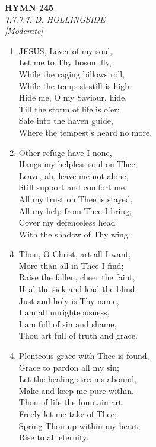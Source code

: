 \documentclass[11pt,a4paper]{article}
\begin{document}
\newpage
\begin{center}
    {\Large \textbf{HYMN 245}}
    \\
    \textit{7.7.7.7. D. HOLLINGSIDE}
    \\
    \textit{\small [Moderate]}
\end{center}
\vspace{1em}

\begin{enumerate}
    \item JESUS, Lover of my soul, \\
            Let me to Thy bosom fly, \\
        While the raging billows roll, \\
            While the tempest still is high. \\
        Hide me, O my Saviour, hide, \\
            Till the storm of life is o'er; \\
        Safe into the haven guide, \\
            Where the tempest's heard no more.

    \item Other refuge have I none, \\
            Hangs my helpless soul on Thee; \\
        Leave, ah, leave me not alone, \\
            Still support and comfort me. \\
        All my trust on Thee is stayed, \\
            All my help from Thee I bring; \\
        Cover my defenceless head \\
            With the shadow of Thy wing.

    \item Thou, O Christ, art all I want, \\
            More than all in Thee I find; \\
        Raise the fallen, cheer the faint, \\
            Heal the sick and lead the blind. \\
        Just and holy is Thy name, \\
            I am all unrighteousness, \\
        I am full of sin and shame, \\
            Thou art full of truth and grace.

    \item Plenteous grace with Thee is found, \\
            Grace to pardon all my sin; \\
        Let the healing streams abound, \\
            Make and keep me pure within. \\
        Thou of life the fountain art, \\
            Freely let me take of Thee; \\
        Spring Thou up within my heart, \\
            Rise to all eternity.

\end{enumerate}
\end{document}
